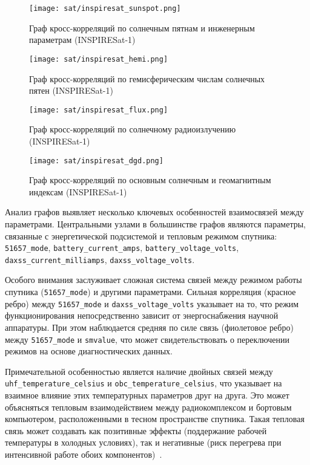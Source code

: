 \begin{figure}[H]
	\centering
	\texttt{[image: sat/inspiresat\_sunspot.png]}
	\caption{Граф кросс-корреляций по солнечным пятнам и инженерным параметрам (INSPIRESat-1)}
	\label{fig:inspiresat_sunspot}
\end{figure}

\begin{figure}[H]
	\centering
	\texttt{[image: sat/inspiresat\_hemi.png]}
	\caption{Граф кросс-корреляций по гемисферическим числам солнечных пятен (INSPIRESat-1)}
	\label{fig:inspiresat_hemi}
\end{figure}

\begin{figure}[H]
	\centering
	\texttt{[image: sat/inspiresat\_flux.png]}
	\caption{Граф кросс-корреляций по солнечному радиоизлучению (INSPIRESat-1)}
	\label{fig:inspiresat_flux}
\end{figure}

\begin{figure}[H]
	\centering
	\texttt{[image: sat/inspiresat\_dgd.png]}
	\caption{Граф кросс-корреляций по основным солнечным и геомагнитным индексам (INSPIRESat-1)}
	\label{fig:inspiresat_dgd}
\end{figure}

Анализ графов выявляет несколько ключевых особенностей взаимосвязей между
параметрами. Центральными узлами в большинстве графов являются параметры,
связанные с энергетической подсистемой и тепловым режимом спутника:
\texttt{51657\_mode}, \texttt{battery\_current\_amps},
\texttt{battery\_voltage\_volts}, \texttt{daxss\_current\_milliamps},
\texttt{daxss\_voltage\_volts}.

Особого внимания заслуживает сложная система связей между режимом работы
спутника (\texttt{51657\_mode}) и другими параметрами. Сильная корреляция
(красное ребро) между \texttt{51657\_mode} и \texttt{daxss\_voltage\_volts}
указывает на то, что режим функционирования непосредственно зависит от
энергоснабжения научной аппаратуры. При этом наблюдается средняя по силе связь
(фиолетовое ребро) между \texttt{51657\_mode} и \texttt{smvalue}, что может
свидетельствовать о переключении режимов на основе диагностических данных.

Примечательной особенностью является наличие двойных связей между
\texttt{uhf\_temperature\_celsius} и \texttt{obc\_temperature\_celsius}, что
указывает на взаимное влияние этих температурных параметров друг на друга. Это
может объясняться тепловым взаимодействием между радиокомплексом и бортовым
компьютером, расположенными в тесном пространстве спутника. Такая тепловая связь
может создавать как позитивные эффекты (поддержание рабочей температуры в
холодных условиях), так и негативные (риск перегрева при интенсивной работе
обоих компонентов)~\cite{core_inspiresat}.

